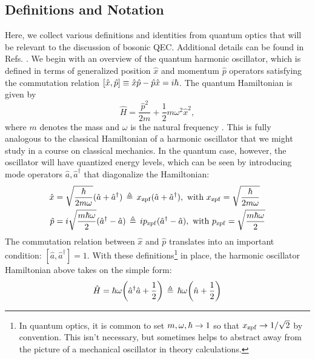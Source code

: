 \subsection{Definitions and Notation \label{sec:2_BosonicQEC_Definitions}}
Here, we collect various definitions and identities from quantum optics that will be relevant to the discussion of bosonic QEC. Additional details can be found in Refs. \cite{shankar1994principles, raimond2006exploring, grynberg2010introduction}. We begin with an overview of the quantum harmonic oscillator, which is defined in terms of generalized position $\hat{x}$ and momentum $\hat{p}$ operators satisfying the commutation relation $[\hat{x}, \hat{p}] \equiv \hat{x}\hat{p} - \hat{p}\hat{x} = i\hbar$. The quantum Hamiltonian is given by
\begin{equation}
    \hat{H} = \frac{\hat{p}^2}{2m} + \frac{1}{2}m\omega^2 \hat{x}^2,
\end{equation}
where $m$ denotes the mass and $\omega$ is the natural frequency \cite{shankar1994principles}. This is fully analogous to the classical Hamiltonian of a harmonic oscillator that we might study in a course on classical mechanics. In the quantum case, however, the oscillator will have quantized energy levels, which can be seen by introducing mode operators $\hat{a}, \hat{a}^\dagger$ that diagonalize the Hamiltonian:
\begin{align}
\begin{split}
     \hat{x} &= \sqrt{\frac{\hbar}{2m\omega}}(\hat{a} + \hat{a}^\dagger) \,\triangleq\, x_{\rm zpf} (\hat{a} + \hat{a}^\dagger), \text{ with } x_{\rm zpf} =  \sqrt{\frac{\hbar}{2m\omega}}\\
     \hat{p} &= i\sqrt{\frac{m\hbar\omega}{2}}(\hat{a}^\dagger - \hat{a}) \,\triangleq\, ip_{\rm zpf} (\hat{a}^\dagger - \hat{a}), \text{ with } p_{\rm zpf} =  \sqrt{\frac{m\hbar\omega}{2}}
\end{split}
\end{align}
The commutation relation between $\hat{x}$ and $\hat{p}$ translates into an important condition: $[\hat{a}, \hat{a}^\dagger] = 1$. With these definitions\footnote{In quantum optics, it is common to set $m, \omega, \hbar \to 1$ so that $x_{\rm zpf} \to 1/\sqrt{2}$ by convention. This isn't necessary, but sometimes helps to abstract away from the picture of a mechanical oscillator in theory calculations.} in place, the harmonic oscillator Hamiltonian above takes on the simple form: 
\begin{equation}
    \hat{H} = \hbar\omega\bigg(\hat{a}^\dagger\hat{a} + \frac{1}{2}\bigg) \,\triangleq\, \hbar\omega\bigg(\hat{n} + \frac{1}{2}\bigg)
\end{equation}
